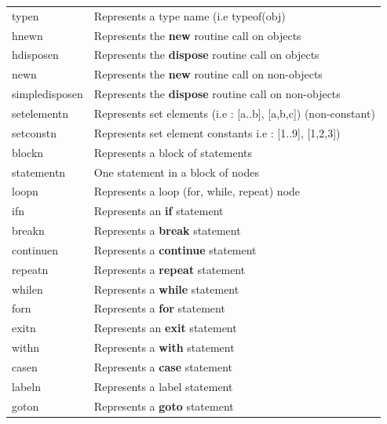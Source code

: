 \documentclass [a4paper,12pt]{article}
\begin{document}
\begin{longtable}{|l|p{10cm}|}
\textsf{typen}&
		\textsf{Represents a type name (i.e typeof(obj)} \\
\textsf{hnewn}&
		\textsf{Represents the }\textsf{\textbf{new }}\textsf{routine call on objects} \\
\textsf{hdisposen}&
		\textsf{Represents the }\textsf{\textbf{dispose}}\textsf{ routine call on objects} \\
\textsf{newn}&
		\textsf{Represents the }\textsf{\textbf{new}}\textsf{ routine call on non-objects} \\
\textsf{simpledisposen}&
		\textsf{Represents the }\textsf{\textbf{dispose}}\textsf{ routine call on non-objects} \\
\textsf{setelementn}&
		\textsf{Represents set elements (i.e : [a..b], [a,b,c]) (non-constant)} \\
\textsf{setconstn}&
		\textsf{Represents set element constants i.e : [1..9], [1,2,3])} \\
\textsf{blockn}&
		\textsf{Represents a block of statements} \\
\textsf{statementn}&
		\textsf{One statement in a block of nodes} \\
\textsf{loopn}&
		\textsf{Represents a loop (for, while, repeat) node} \\
\textsf{ifn}&
		\textsf{Represents an }\textsf{\textbf{if}}\textsf{ statement} \\
\textsf{breakn}&
		\textsf{Represents a }\textsf{\textbf{break}}\textsf{ statement} \\
\textsf{continuen}&
		\textsf{Represents a }\textsf{\textbf{continue}}\textsf{ statement} \\
\textsf{repeatn}&
		\textsf{Represents a }\textsf{\textbf{repeat }}\textsf{statement} \\
\textsf{whilen}&
		\textsf{Represents a }\textsf{\textbf{while}}\textsf{ statement} \\
\textsf{forn}&
		\textsf{Represents a }\textsf{\textbf{for}}\textsf{ statement} \\
\textsf{exitn}&
		\textsf{Represents an }\textsf{\textbf{exit}}\textsf{ statement} \\
\textsf{withn}&
		\textsf{Represents a }\textsf{\textbf{with}}\textsf{ statement} \\
\textsf{casen}&
		\textsf{Represents a }\textsf{\textbf{case}}\textsf{ statement} \\
\textsf{labeln}&
		\textsf{Represents a label statement} \\
\textsf{goton}&
		\textsf{Represents a }\textsf{\textbf{goto}}\textsf{ statement} \\

\end{longtable}
\end{document}
